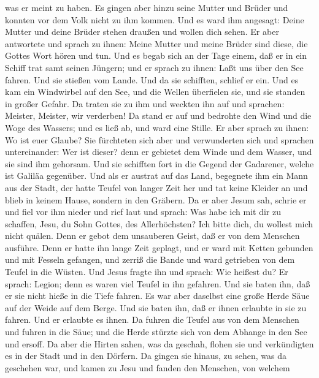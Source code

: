 was er meint zu haben.  Es gingen aber hinzu seine Mutter
und Brüder und konnten vor dem Volk nicht zu ihm kommen. 
Und es ward ihm angesagt: Deine Mutter und deine Brüder stehen draußen
und wollen dich sehen.  Er aber antwortete und sprach zu
ihnen: Meine Mutter und meine Brüder sind diese, die Gottes Wort hören
und tun.  Und es begab sich an der Tage einem, daß er in
ein Schiff trat samt seinen Jüngern; und er sprach zu ihnen: Laßt uns
über den See fahren. Und sie stießen vom Lande.  Und da sie
schifften, schlief er ein. Und es kam ein Windwirbel auf den See, und
die Wellen überfielen sie, und sie standen in großer Gefahr.
 Da traten sie zu ihm und weckten ihn auf und sprachen:
Meister, Meister, wir verderben! Da stand er auf und bedrohte den Wind
und die Woge des Wassers; und es ließ ab, und ward eine Stille.
 Er aber sprach zu ihnen: Wo ist euer Glaube? Sie
fürchteten sich aber und verwunderten sich und sprachen untereinander:
Wer ist dieser? denn er gebietet dem Winde und dem Wasser, und sie sind
ihm gehorsam.  Und sie schifften fort in die Gegend der
Gadarener, welche ist Galiläa gegenüber.  Und als er
austrat auf das Land, begegnete ihm ein Mann aus der Stadt, der hatte
Teufel von langer Zeit her und tat keine Kleider an und blieb in keinem
Hause, sondern in den Gräbern.  Da er aber Jesum sah,
schrie er und fiel vor ihm nieder und rief laut und sprach: Was habe ich
mit dir zu schaffen, Jesu, du Sohn Gottes, des Allerhöchsten? Ich bitte
dich, du wollest mich nicht quälen.  Denn er gebot dem
unsauberen Geist, daß er von dem Menschen ausführe. Denn er hatte ihn
lange Zeit geplagt, und er ward mit Ketten gebunden und mit Fesseln
gefangen, und zerriß die Bande und ward getrieben von dem Teufel in die
Wüsten.  Und Jesus fragte ihn und sprach: Wie heißest du?
Er sprach: Legion; denn es waren viel Teufel in ihn gefahren.
 Und sie baten ihn, daß er sie nicht hieße in die Tiefe
fahren.  Es war aber daselbst eine große Herde Säue auf der
Weide auf dem Berge. Und sie baten ihn, daß er ihnen erlaubte in sie zu
fahren. Und er erlaubte es ihnen.  Da fuhren die Teufel aus
von dem Menschen und fuhren in die Säue; und die Herde stürzte sich von
dem Abhange in den See und ersoff.  Da aber die Hirten
sahen, was da geschah, flohen sie und verkündigten es in der Stadt und
in den Dörfern.  Da gingen sie hinaus, zu sehen, was da
geschehen war, und kamen zu Jesu und fanden den Menschen, von welchem
